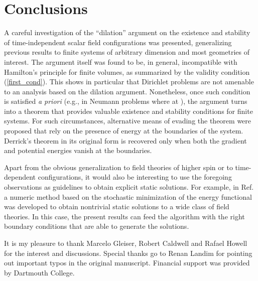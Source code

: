 \documentclass[a4paper,prd,twocolumn,showpacs,amsmath]{revtex4}
\providecommand{\vecn}{{\bf \hat n}}
\providecommand{\domega}{\partial \Omega}
\begin{document}
\section{Conclusions} \label{concl}

A careful investigation of the ``dilation'' argument on the existence and stability of
time-independent scalar field configurations was presented, generalizing previous results to finite
systems of arbitrary dimension and most geometries of interest. The argument itself was found to be,
in general, incompatible with
Hamilton's principle for finite volumes, as summarized by the validity condition (\ref{first_cond}).
This shows in particular that Dirichlet problems are not amenable to an analysis based on the dilation
argument.
Nonetheless, once such condition is satisfied {\em a priori} (e.g., in Neumann problems
where \myHighlight{$\vecn\cdot\nabla\phi_i=0$}\coordHE{} at \myHighlight{$\domega$}\coordHE{}), the argument
turns into a theorem that provides valuable existence and stability conditions for finite systems.
For such circumstances, alternative means of evading the theorem were proposed that rely on the presence of
energy at the boundaries of the system. Derrick's theorem in its original form is recovered only when
both the gradient and potential energies vanish at the boundaries.

Apart from the obvious generalization to field theories of higher spin or to time-dependent
configurations, it would also be interesting to use the foregoing observations as guidelines to obtain
explicit static solutions. For example, in Ref. \cite{hale} a numeric method based on the stochastic
minimization of the energy functional was developed to obtain nontrivial static solutions to a wide
class of field theories. In this case, the present results can feed the algorithm with the right
boundary conditions that are able to generate the solutions.

\acknowledgments

It is my pleasure to thank Marcelo Gleiser, Robert Caldwell and Rafael Howell for the
interest and discussions. Special thanks go to Renan Landim for pointing out important typos in
the original manuscript. Financial support was provided by Dartmouth College.

\appendix
\end{document}
